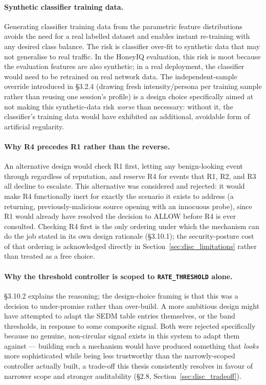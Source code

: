 \paragraph{Synthetic classifier training data.}
Generating classifier training data from the parametric feature distributions
avoids the need for a real labelled dataset and enables instant re-training
with any desired class balance.
The risk is classifier over-fit to synthetic data that may not generalise
to real traffic.
In the HoneyIQ evaluation, this risk is moot because the evaluation features
are also synthetic; in a real deployment, the classifier would need to be
retrained on real network data.
The independent-sample override introduced in \S3.2.4 (drawing fresh
intensity/persona per training sample rather than reusing one session's
profile) is a design choice specifically aimed at not making this
synthetic-data risk \emph{worse} than necessary: without it, the
classifier's training data would have exhibited an additional, avoidable
form of artificial regularity.

\paragraph{Why R4 precedes R1 rather than the reverse.}
An alternative design would check R1 first, letting any benign-looking
event through regardless of reputation, and reserve R4 for events that R1,
R2, and R3 all decline to escalate.
This alternative was considered and rejected: it would make R4 functionally
inert for exactly the scenario it exists to address (a returning,
previously-malicious source opening with an innocuous probe), since R1
would already have resolved the decision to ALLOW before R4 is ever
consulted.
Checking R4 first is the only ordering under which the mechanism can do the
job stated in its own design rationale (\S3.10.1); the security-posture
cost of that ordering is acknowledged directly in Section~\ref{sec:disc_limitations}
rather than treated as a free choice.

\paragraph{Why the threshold controller is scoped to \texttt{RATE\_THRESHOLD}
alone.}
\S3.10.2 explains the reasoning; the design-choice framing is that this was
a decision to under-promise rather than over-build.
A more ambitious design might have attempted to adapt the SEDM table
entries themselves, or the band thresholds, in response to some composite
signal.
Both were rejected specifically because no genuine, non-circular signal
exists in this system to adapt them against --- building such a mechanism
would have produced something that \emph{looks} more sophisticated while
being less trustworthy than the narrowly-scoped controller actually built,
a trade-off this thesis consistently resolves in favour of narrower scope
and stronger auditability (\S2.8, Section~\ref{sec:disc_tradeoff}).

